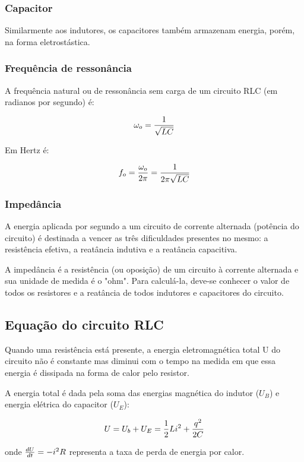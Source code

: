 \subsubsection{Capacitor}

Similarmente aos indutores, os capacitores também armazenam energia, porém, na forma eletrostástica. 

\subsubsection{Frequência de ressonância}

A frequência natural ou de ressonância sem carga de um circuito RLC (em radianos por segundo) é:

\[\large \omega _{o} = \frac{1}{\sqrt{LC}}\]

Em Hertz é:

\[\large f_{o} = \frac{\omega _{o}}{2\pi} = \frac{1}{2\pi\sqrt{LC}}\]

\subsubsection{Impedância}

A energia aplicada por segundo a um circuito de corrente alternada (potência do circuito) é destinada a vencer as três dificuldades presentes no mesmo: a resistência efetiva, a reatância indutiva e a reatância capacitiva.

A impedância é a resistência (ou oposição) de um circuito à corrente alternada e sua unidade de medida é o "ohm". Para calculá-la, deve-se conhecer o valor de todos os resistores e a reatância de todos indutores e capacitores do circuito.

\subsection{Equação do circuito RLC}

Quando uma resistência está presente, a energia eletromagnética total U do circuito não é constante mas diminui com o tempo na medida em que essa energia é dissipada na forma de calor pelo resistor.

A energia total é dada pela soma das energias magnética do indutor ($U_{B}$) e energia elétrica do capacitor ($U_{E}$):

\[\large U = U_{b} + U_{E} = \frac{1}{2}Li^2+\frac{q^2}{2C}\]

onde $\large \frac{dU}{dt} = -i^2R$ representa a taxa de perda de energia por calor.

